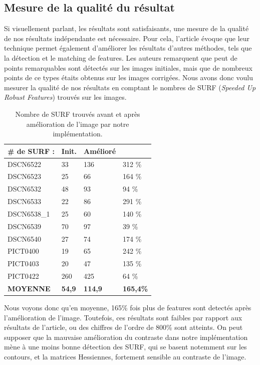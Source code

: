 \documentclass[twoside]{article}
\begin{document}
\subsection{Mesure de la qualité du résultat}
Si visuellement parlant, les résultats sont satisfaisants, une mesure de la qualité de nos résultats indépendante est nécessaire. Pour cela, l'article évoque que leur technique permet également d'améliorer les résultats d'autres méthodes, tels que la détection et le matching de features. Les auteurs remarquent que peut de points remarquables sont détectés sur les images initiales, mais que de nombreux points de ce types étaits obtenus sur les images corrigées. Nous avons donc voulu mesurer la qualité de nos résultats en comptant le nombres de SURF (\emph{Speeded Up Robust Features}) trouvés sur les images.

\begin{table}[H]
	\centering
    \begin{tabular}{llll}
    \# de SURF : &Init. &Amélioré\\
    \toprule
    DSCN6522     & 33       & 136        & 312 \%     \\
    DSCN6523     & 25       & 66         & 164 \%     \\
    DSCN6532     & 48       & 93         & 94 \%      \\
    DSCN6533     & 22       & 86         & 291 \%     \\
    DSCN6538\_1  & 25       & 60         & 140 \%     \\
    DSCN6539     & 70       & 97         & 39 \%      \\
    DSCN6540     & 27       & 74         & 174 \%     \\
    PICT0400     & 19       & 65         & 242 \%     \\
    PICT0403     & 20       & 47         & 135 \%     \\
    PICT0422     & 260      & 425        & 64 \%      \\
    \toprule
    \textbf{MOYENNE}        & \textbf{54,9}     & \textbf{114,9}   & \textbf{165,4\%}      \\
    \end{tabular}
    \caption{Nombre de SURF trouvés avant et après amélioration de l'image par notre implémentation.}
\end{table}

Nous voyons donc qu'en moyenne, 165\% fois plus de features sont detectés après l'amélioration de l'image. Toutefois, ces résultats sont faibles par rapport aux résultats de l'article, ou des chiffres de l'ordre de 800\% sont atteints. On peut supposer que la mauvaise amélioration du contraste dans notre implémentation mène à une moins bonne détection des SURF, qui se basent notemment sur les contours, et la matrices Hessiennes, fortement sensible au contraste de l'image.
\end{document}
